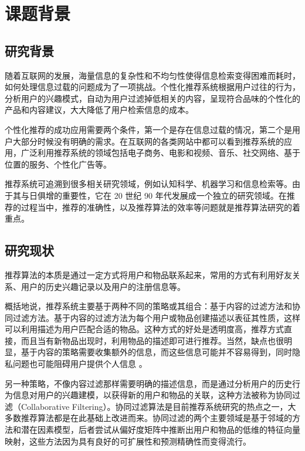 
\centerline{\textbf{}}
\bigskip

\chapter{课题背景}

\section{研究背景}
随着互联网的发展，海量信息的复杂性和不均匀性使得信息检索变得困难而耗时，如何处理信息过载的问题成为了一项挑战。个性化推荐系统根据用户过往的行为，分析用户的兴趣模式，自动为用户过滤掉低相关的内容，呈现符合品味的个性化的产品和内容建议，大大降低了用户检索信息的成本。

个性化推荐的成功应用需要两个条件，第一个是存在信息过载的情况，第二个是用户大部分时候没有明确的需求。在互联网的各类网站中都可以看到推荐系统的应用，广泛利用推荐系统的领域包括电子商务、电影和视频、音乐、社交网络、基于位置的服务、个性化广告等。

推荐系统可追溯到很多相关研究领域，例如认知科学、机器学习和信息检索等\cite{肖力涛2016基于隐式因子和隐式主题的跨域推荐算法研究}。由于其与日俱增的重要性，它在 20 世纪 90 年代发展成一个独立的研究领域。在推荐的过程当中，推荐的准确性，以及推荐算法的效率等问题就是推荐算法研究的着重点。

\section{研究现状} 
推荐算法的本质是通过一定方式将用户和物品联系起来，常用的方式有利用好友关系、用户的历史兴趣记录以及用户的注册信息等\cite{项亮2012推荐系统实践}。

概括地说，推荐系统主要基于两种不同的策略或其组合：基于内容的过滤方法和协同过滤方法。基于内容的过滤方法为每个用户或物品创建描述以表征其性质，这样可以利用描述为用户匹配合适的物品。这种方式的好处是透明度高，推荐方式直接，而且当有新物品出现时，利用物品的描述即可进行推荐。当然，缺点也很明显，基于内容的策略需要收集额外的信息，而这些信息可能并不容易得到，同时隐私问题也可能阻碍用户提供个人信息 \cite{Koren2009Matrix}。

另一种策略，不像内容过滤那样需要明确的描述信息，而是通过分析用户的历史行为信息对用户的兴趣建模，以获得新的用户和物品的关联，这种方法被称为协同过滤（Collaborative Filtering）\cite{Goldberg1992Using}。协同过滤算法是目前推荐系统研究的热点之一，大多数推荐算法都是在此基础上改进而来。协同过滤的两个主要领域是基于邻域的方法和潜在因素模型，后者尝试从偏好度矩阵中推断出用户和物品的低维的特征向量映射，这些方法因为具有良好的可扩展性和预测精确性而变得流行。


